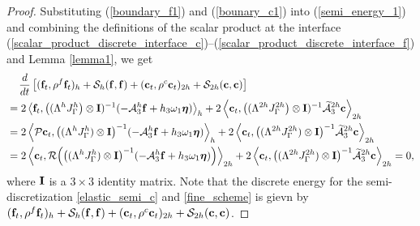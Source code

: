 \begin{proof}
	Substituting (\ref{boundary_f1}) and (\ref{bounary_c1}) into (\ref{semi_energy_1}) and combining the definitions of the scalar product at the interface (\ref{scalar_product_discrete_interface_c})--(\ref{scalar_product_discrete_interface_f}) and Lemma \ref{lemma1}, we get
	\begin{align*}\label{semi_energy_2}
	&\hspace{0.4cm}\frac{d}{dt}\left[({\bf f}_t,\rho^f {\bf f}_t)_{h} + \mathcal{S}_{h}({\bf f},{\bf f}) + ({\bf c}_t,\rho^{c} {\bf c}_t)_{2h} + \mathcal{S}_{2h}({\bf c},{\bf c}) \right]   \nonumber\\
	& = 2\left<{\bf f}_t,\big(({\Lambda}^{h}{J}^h_\Gamma\big)\otimes {\bf I})^{-1}(-\mathcal{A}_3^h{\bf f}+h_3\omega_1{\bm \eta})\right>_{h}+ 2\left<{\bf c}_t,\big(({\Lambda}^{2h}{J}^{2h}_\Gamma\big)\otimes{\bf I})^{-1}\wt{\mathcal{A}}_3^{2h}{\bf c}\right>_{2h} \nonumber\\
	& = 2\left<{\mathcal{P}}{\bf c}_t,\big(({\Lambda}^{h}{J}^h_\Gamma)\otimes{\bf I}\big)^{-1}(-\mathcal{A}_3^h{\bf f}+h_3\omega_1{\bm \eta})\right>_{h}+ 2\left<{\bf c}_t, \big(({\Lambda}^{2h}{J}^{2h}_\Gamma)\otimes{\bf I}\big)^{-1}\wt{\mathcal{A}}_3^{2h}{\bf c}\right>_{2h} \nonumber\\
	& = 2\left<{\bf c}_t,{\mathcal{R}}\Big(\big(({\Lambda}^{h}{J}^h_\Gamma)\otimes{\bf I}\big)^{-1}(-\mathcal{A}_3^h{\bf f}+h_3\omega_1{\bm \eta})\Big)\right>_{2h}+ 2\left<{\bf c}_t,\big(({\Lambda}^{2h}{J}^{2h}_\Gamma)\otimes{\bf I}\big)^{-1}\wt{\mathcal{A}}_3^{2h}{\bf c}\right>_{2h} = 0,
	\end{align*}
	where ${\bf I}$ is a $3\times3$ identity matrix. Note that the discrete energy for the semi-discretization \eqref{elastic_semi_c} and \eqref{fine_scheme} is gievn by $({\bf f}_t,\rho^f {\bf f}_t)_{h} + \mathcal{S}_{h}({\bf f},{\bf f}) + ({\bf c}_t,\rho^{c} {\bf c}_t)_{2h} + \mathcal{S}_{2h}({\bf c},{\bf c})$.
\end{proof}








 